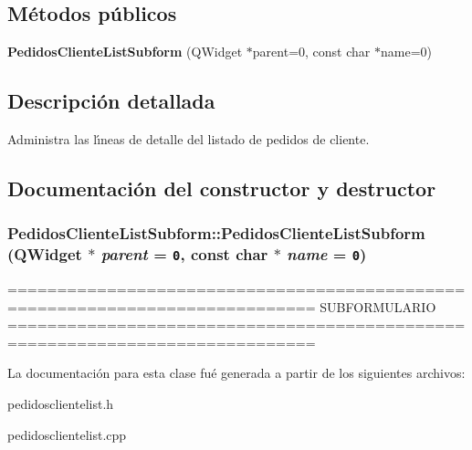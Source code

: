 \subsection*{M\'{e}todos p\'{u}blicos}
\begin{CompactItemize}
\item 
{\bf Pedidos\-Cliente\-List\-Subform} (QWidget $\ast$parent=0, const char $\ast$name=0)
\end{CompactItemize}


\subsection{Descripci\'{o}n detallada}
Administra las l\'{\i}neas de detalle del listado de pedidos de cliente. 



\subsection{Documentaci\'{o}n del constructor y destructor}
\subsubsection{\setlength{\rightskip}{0pt plus 5cm}Pedidos\-Cliente\-List\-Subform::Pedidos\-Cliente\-List\-Subform (QWidget $\ast$ {\em parent} = {\tt 0}, const char $\ast$ {\em name} = {\tt 0})}\label{classPedidosClienteListSubform_a0}


============================================================================= SUBFORMULARIO ============================================================================= 

La documentaci\'{o}n para esta clase fu\'{e} generada a partir de los siguientes archivos:\begin{CompactItemize}
\item 
pedidosclientelist.h\item 
pedidosclientelist.cpp\end{CompactItemize}
